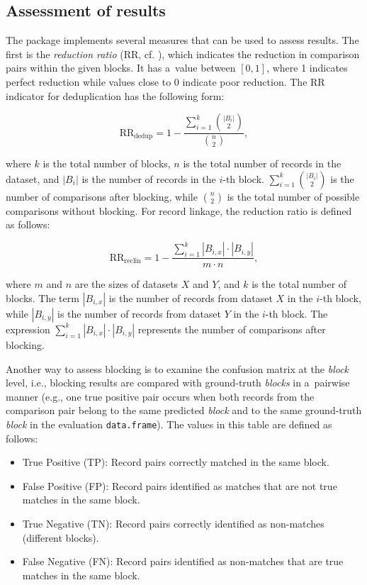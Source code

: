 \subsection{Assessment of results}\label{sec-assess}

The package implements several measures that can be used to assess
results. The first is the \emph{reduction ratio} (RR, cf. \citet{christen2007quality}), which indicates the
reduction in comparison pairs within the given blocks. It has a~value
between \([0,1]\), where 1 indicates perfect reduction while values close
to 0 indicate poor reduction. The RR indicator for deduplication has the
following form:

\[
\text{RR}_{\text{dedup}} = 1 - \frac{\sum\limits_{i=1}^{k} \binom{|B_i|}{2}}{\binom{n}{2}},
\]

\noindent where \(k\) is the total number of blocks, \(n\) is the total
number of records in the dataset, and \(|B_i|\) is the number of records
in the \(i\)-th block. \(\sum\limits_{i=1}^{k} \binom{|B_i|}{2}\) is the
number of comparisons after blocking, while \(\binom{n}{2}\) is the total
number of possible comparisons without blocking. For record linkage, the
reduction ratio is defined as follows:

\[
\text{RR}_{\text{reclin}} = 1 - \frac{\sum\limits_{i=1}^{k} |B_{i,x}| \cdot |B_{i,y}|} {m \cdot n},
\]

\noindent where \(m\) and \(n\) are the sizes of datasets \(X\) and \(Y\), and
\(k\) is the total number of blocks. The term \(|B_{i,x}|\) is the number of
records from dataset \(X\) in the \(i\)-th block, while \(|B_{i,y}|\) is the
number of records from dataset \(Y\) in the \(i\)-th block. The expression
\(\sum\limits_{i=1}^{k} |B_{i,x}| \cdot |B_{i,y}|\) represents the number
of comparisons after blocking.

Another way to assess blocking is to examine the confusion matrix at the
\emph{block} level, i.e., blocking results are compared with ground-truth
\emph{blocks} in a~pairwise manner (e.g., one true positive pair occurs when
both records from the comparison pair belong to the same predicted
\emph{block} and to the same ground-truth \emph{block} in the evaluation
\texttt{data.frame}). The values in this table are defined as follows:

\begin{itemize}
\tightlist
\item
  True Positive (TP): Record pairs correctly matched in the same
  block.
\item
  False Positive (FP): Record pairs identified as matches that are not
  true matches in the same block.
\item
  True Negative (TN): Record pairs correctly identified as non-matches
  (different blocks).
\item
  False Negative (FN): Record pairs identified as non-matches that are
  true matches in the same block.
\end{itemize}

